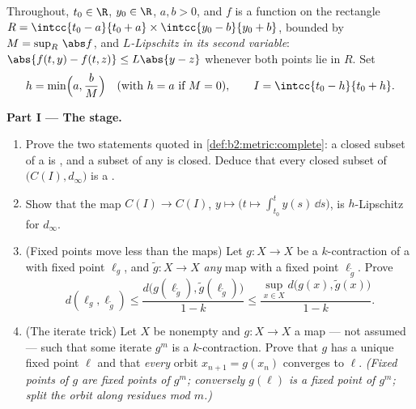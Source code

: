 \begin{problem}
\label{pb:b2:metric:1}
Throughout, $t_0 \in \R$, $y_0 \in \R$, $a, b > 0$, and $f$ is a
 function on the rectangle $R = \intcc{t_0 - a}{t_0 +
a} \times \intcc{y_0 - b}{y_0 + b}$, bounded by $M =
\sup_R\,\abs f$, and \emph{$L$-Lipschitz in its second variable}:
$\abs{f(t, y) - f(t, z)} \leq L\abs{y - z}$ whenever both points
lie in $R$. Set
\[
h = \min\Bigl(a, \frac bM\Bigr) \quad (\text{with } h = a
\text{ if } M = 0), \qquad I = \intcc{t_0 - h}{t_0 + h}.
\]

\medskip
\noindent\textbf{Part I --- The  stage.}
\begin{enumerate}
  \item Prove the two statements quoted in
        \cref{def:b2:metric:complete}: a closed subset of a
         is , and a  subset
        of any  is closed. Deduce that every closed
        subset of $\bigl(C(I), d_\infty\bigr)$ is a .
  \item Show that the map $C(I) \to C(I)$, $y \mapsto \bigl(t
        \mapsto \int_{t_0}^{t}y(s)\,\dd s\bigr)$, is
        $h$-Lipschitz for $d_\infty$.
  \item (Fixed points move less than the maps) Let $g \colon X
        \to X$ be a $k$-contraction of a  with fixed
        point $\ell_g$, and $\widetilde g \colon X \to X$
        \emph{any} map with a fixed point $\ell_{\widetilde g}$.
        Prove
        \[
        d(\ell_g, \ell_{\widetilde g}) \leq
        \frac{d\bigl(g(\ell_{\widetilde g}),
        \widetilde g(\ell_{\widetilde g})\bigr)}{1 - k}
        \leq \frac{\sup_{x \in X} d\bigl(g(x), \widetilde
        g(x)\bigr)}{1 - k}.
        \]
  \item (The iterate trick) Let $X$ be  nonempty and $g
        \colon X \to X$ a map --- not assumed  ---
        such that some iterate $g^m$ is a $k$-contraction.
        Prove that $g$ has a unique fixed point $\ell$ and that
        \emph{every} orbit $x_{n+1} = g(x_n)$ converges to
        $\ell$. \emph{(Fixed points of $g$ are fixed points of
        $g^m$; conversely $g(\ell)$ is a fixed point of $g^m$;
        split the orbit along residues mod $m$.)}
\end{enumerate}


\end{problem}
